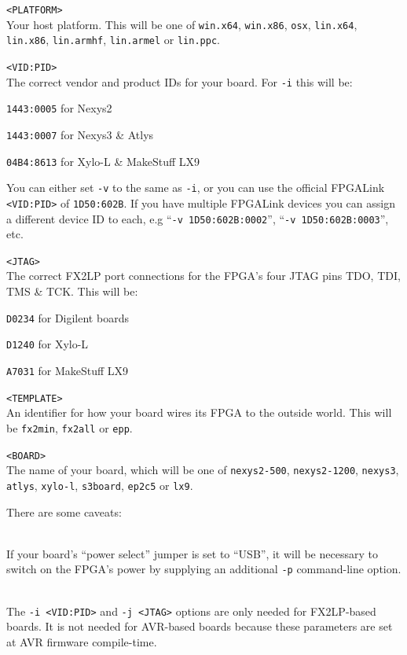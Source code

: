 \begin{desc}
  \item[\texttt{<PLATFORM>}] \hfill \\
    Your host platform. This will be one of \texttt{win.x64}, \texttt{win.x86}, \texttt{osx}, \texttt{lin.x64}, \texttt{lin.x86}, \texttt{lin.armhf}, \texttt{lin.armel} or \texttt{lin.ppc}.
  \item[\texttt{<VID:PID>}] \hfill \\
    The correct vendor and product IDs for your board. For \texttt{-i} this will be:
    \begin{blobs}
      \item \texttt{1443:0005} for Nexys2
      \item \texttt{1443:0007} for Nexys3 \& Atlys
      \item \texttt{04B4:8613} for Xylo-L \& MakeStuff LX9
    \end{blobs}
    You can either set \texttt{-v} to the same as \texttt{-i}, or you can use the official FPGALink \texttt{<VID:PID>} of \texttt{1D50:602B}. If you have multiple FPGALink devices you can assign a different device ID to each, e.g ``\texttt{-v 1D50:602B:0002}'', ``\texttt{-v 1D50:602B:0003}'', etc.
  \item[\texttt{<JTAG>}] \hfill \\
    The correct FX2LP port connections for the FPGA's four JTAG pins TDO, TDI, TMS \& TCK. This will be:
    \begin{blobs}
      \item \texttt{D0234} for Digilent boards
      \item \texttt{D1240} for Xylo-L
      \item \texttt{A7031} for MakeStuff LX9
    \end{blobs}
  \item[\texttt{<TEMPLATE>}] \hfill \\
    An identifier for how your board wires its FPGA to the outside world. This will be \texttt{fx2min}, \texttt{fx2all} or \texttt{epp}.
  \item[\texttt{<BOARD>}] \hfill \\
    The name of your board, which will be one of \texttt{nexys2-500}, \texttt{nexys2-1200}, \texttt{nexys3}, \texttt{atlys}, \texttt{xylo-l}, \texttt{s3board}, \texttt{ep2c5} or \texttt{lx9}.
\end{desc}

There are some caveats:

\begin{desc}
  \item[\sffamily{Nexys2 Users:}] \hfill \\
    If your board's ``power select'' jumper is set to ``USB'', it will be necessary to switch on the FPGA's power by supplying an additional \texttt{-p} command-line option.
  \item[\sffamily{AVR-Based Boards:}] \hfill \\
    The \texttt{-i <VID:PID>} and \texttt{-j <JTAG>} options are only needed for FX2LP-based boards. It is not needed for AVR-based boards because these parameters are set at AVR firmware compile-time.
\end{desc}

